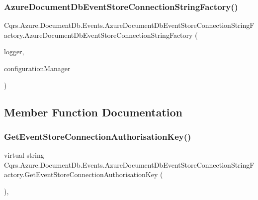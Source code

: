 \subsubsection{\texorpdfstring{Azure\+Document\+Db\+Event\+Store\+Connection\+String\+Factory()}{AzureDocumentDbEventStoreConnectionStringFactory()}}
{\footnotesize\ttfamily Cqrs.\+Azure.\+Document\+Db.\+Events.\+Azure\+Document\+Db\+Event\+Store\+Connection\+String\+Factory.\+Azure\+Document\+Db\+Event\+Store\+Connection\+String\+Factory (\begin{DoxyParamCaption}\item[{I\+Logger}]{logger,  }\item[{\hyperlink{interfaceCqrs_1_1Configuration_1_1IConfigurationManager}{I\+Configuration\+Manager}}]{configuration\+Manager }\end{DoxyParamCaption})}



\subsection{Member Function Documentation}
\mbox{\label{classCqrs_1_1Azure_1_1DocumentDb_1_1Events_1_1AzureDocumentDbEventStoreConnectionStringFactory_aa16b2178e1ca8893c120097f6dd47022}} 
\subsubsection{\texorpdfstring{Get\+Event\+Store\+Connection\+Authorisation\+Key()}{GetEventStoreConnectionAuthorisationKey()}}
{\footnotesize\ttfamily virtual string Cqrs.\+Azure.\+Document\+Db.\+Events.\+Azure\+Document\+Db\+Event\+Store\+Connection\+String\+Factory.\+Get\+Event\+Store\+Connection\+Authorisation\+Key (\begin{DoxyParamCaption}{ }\end{DoxyParamCaption})\hspace{0.3cm}{\ttfamily [protected]}, {\ttfamily [virtual]}}

